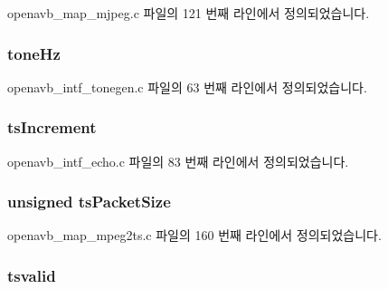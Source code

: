 openavb\+\_\+map\+\_\+mjpeg.\+c 파일의 121 번째 라인에서 정의되었습니다.

\subsubsection[{\texorpdfstring{tone\+Hz}{toneHz}}]{ tone\+Hz}\hypertarget{structpvt__data__t_a96e806731a7839f056148b8e0d11d167}{}\label{structpvt__data__t_a96e806731a7839f056148b8e0d11d167}


openavb\+\_\+intf\+\_\+tonegen.\+c 파일의 63 번째 라인에서 정의되었습니다.

\subsubsection[{\texorpdfstring{ts\+Increment}{tsIncrement}}]{ ts\+Increment}\hypertarget{structpvt__data__t_a64035b341fa5111e971c852958aa824a}{}\label{structpvt__data__t_a64035b341fa5111e971c852958aa824a}


openavb\+\_\+intf\+\_\+echo.\+c 파일의 83 번째 라인에서 정의되었습니다.

\subsubsection[{\texorpdfstring{ts\+Packet\+Size}{tsPacketSize}}]{\setlength{\rightskip}{0pt plus 5cm}unsigned ts\+Packet\+Size}\hypertarget{structpvt__data__t_aa01d4378c00bfa8a08b48c2f49974fb1}{}\label{structpvt__data__t_aa01d4378c00bfa8a08b48c2f49974fb1}


openavb\+\_\+map\+\_\+mpeg2ts.\+c 파일의 160 번째 라인에서 정의되었습니다.

\subsubsection[{\texorpdfstring{tsvalid}{tsvalid}}]{ tsvalid}\hypertarget{structpvt__data__t_ad5783c4b5eb44f07342aed4e6f5b346c}{}\label{structpvt__data__t_ad5783c4b5eb44f07342aed4e6f5b346c}


